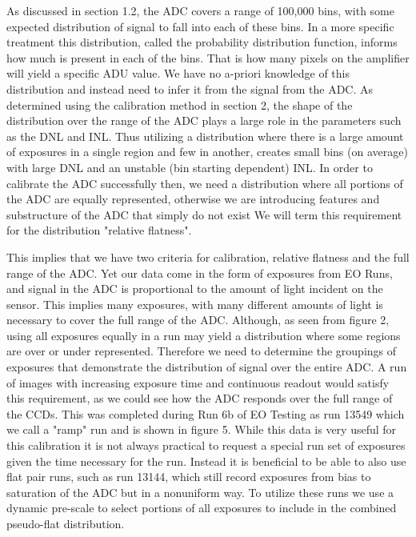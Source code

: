 \documentclass[11pt, letterpaper]{article}
\begin{document}
As discussed in section 1.2, the ADC covers a range of 100,000 bins, with some expected distribution of signal to fall into each of these bins. 
In a more specific treatment this distribution, called the probability distribution function, informs how much is present in each of the bins.
That is how many pixels on the amplifier will yield a specific ADU value.
We have no a-priori knowledge of this distribution and instead need to infer it from the signal from the ADC.
As determined using the calibration method in section 2, the shape of the distribution over the range of the ADC plays a large role in the parameters such as the DNL and INL.
Thus utilizing a distribution where there is a large amount of exposures in a single region and few in another, creates small bins (on average) with large DNL and an unstable (bin starting dependent) INL. 
In order to calibrate the ADC successfully then, we need a distribution where all portions of the ADC are equally represented, otherwise we are introducing features and substructure of the ADC that simply do not exist
We will term this requirement for the distribution "relative flatness". 
\indent 


This implies that we have two criteria for calibration, relative flatness and the full range of the ADC. 
Yet our data come in the form of exposures from EO Runs, and signal in the ADC is proportional to the amount of light incident on the sensor. 
This implies many exposures, with many different amounts of light is necessary to cover the full range of the ADC. 
Although, as seen from figure 2, using all exposures equally in a run may yield a distribution where some regions are over or under represented. 
Therefore we need to determine the groupings of exposures that demonstrate the distribution of signal over the entire ADC. 
A run of images with increasing exposure time and continuous readout would satisfy this requirement, as we could see how the ADC responds over the full range of the CCDs. 
This was completed during Run 6b of EO Testing as run 13549 which we call a "ramp" run and is shown in figure 5.
While this data is very useful for this calibration it is not always practical to request a special run set of exposures given the time necessary for the run.
Instead it is beneficial to be able to also use flat pair runs, such as run 13144, which still record exposures from bias to saturation of the ADC but in a nonuniform way.
To utilize these runs we use a dynamic pre-scale to select portions of all exposures to include in the combined pseudo-flat distribution. 
\end{document}
